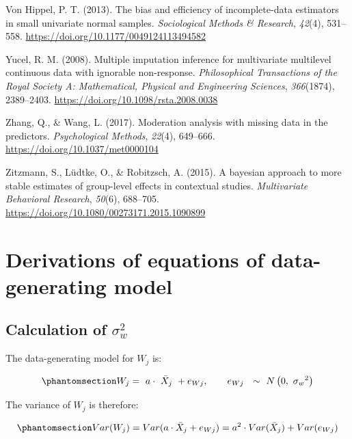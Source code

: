 \documentclass[
  letterpaper,
  11pt,
  english,
  singlespacing,
  headsepline,
  openany]{MastersDoctoralThesis}
\newlength{\cslhangindent}
\newenvironment{CSLReferences}[2] %
 {\begin{list}{}{%
  \setlength{\itemindent}{0pt}
  \setlength{\leftmargin}{0pt}
  \setlength{\parsep}{0pt}
  \ifodd #1
   \setlength{\leftmargin}{\cslhangindent}
   \setlength{\itemindent}{-1\cslhangindent}
  \fi
  \setlength{\itemsep}{#2\baselineskip}}}
 {\end{list}}
\begin{document}
\begin{CSLReferences}{1}{0}
Von Hippel, P. T. (2013). The bias and efficiency of incomplete-data
estimators in small univariate normal samples. \emph{Sociological
Methods \& Research}, \emph{42}(4), 531--558.
\url{https://doi.org/10.1177/0049124113494582}

Yucel, R. M. (2008). Multiple imputation inference for multivariate
multilevel continuous data with ignorable non-response.
\emph{Philosophical Transactions of the Royal Society A: Mathematical,
Physical and Engineering Sciences}, \emph{366}(1874), 2389--2403.
\url{https://doi.org/10.1098/rsta.2008.0038}

Zhang, Q., \& Wang, L. (2017). Moderation analysis with missing data in
the predictors. \emph{Psychological Methods}, \emph{22}(4), 649--666.
\url{https://doi.org/10.1037/met0000104}

Zitzmann, S., Lüdtke, O., \& Robitzsch, A. (2015). A bayesian approach
to more stable estimates of group-level effects in contextual studies.
\emph{Multivariate Behavioral Research}, \emph{50}(6), 688--705.
\url{https://doi.org/10.1080/00273171.2015.1090899}

\end{CSLReferences}

\cleardoublepage
{}
{}
\appendix

\chapter{Derivations of equations of data-generating
model}\label{sec-appA}

\section{\texorpdfstring{Calculation of
\(\sigma_w^2\)}{Calculation of \textbackslash sigma\_w\^{}2}}\label{calculation-of-sigma_w2}

The data-generating model for \(W_j\) is:

\begin{equation}\phantomsection\label{eq-W}{W_j=\ a\cdot\ {\bar{X}}_j\ +e_{Wj}, \qquad e_{Wj}\ \ \sim\ N\left(0,\ {\sigma_w}^2\right)}\end{equation}

The variance of \(W_j\) is therefore:

\begin{equation}\phantomsection\label{eq-varw}{
Var(W_j) = Var(a \cdot \bar{X}_j + e_{Wj}) 
= a^2 \cdot Var(\bar{X}_j) + Var(e_{Wj})
}\end{equation}
\end{document}
